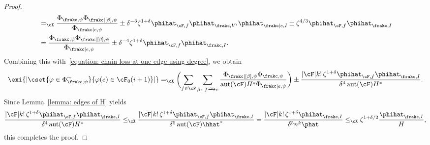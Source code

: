 \documentclass[11pt]{amsart}
\DeclarePairedDelimiter{\paren}{\lparen}{\rparen}
\DeclarePairedDelimiter{\abs}{\lvert}{\rvert}
\newcommand{\Xleq}{\leq_{\cX}}
\newcommand{\Xeq}{=_{\cX}}
\def\phi{\varphi}
\newcommand{\bijection}{\mathchoice
	{\xrightarrow{\smash{\raisebox{-3pt}{$\scriptstyle\sim$}}}}%
	{\xrightarrow{\smash{\raisebox{-3pt}{$\scriptstyle\sim$}}}}%
	{\xrightarrow{\smash{\raisebox{-2.5pt}{$\scriptscriptstyle\sim$}}}}%
	{\xrightarrow{\smash{\raisebox{-2.5pt}{$\scriptscriptstyle\sim$}}}}%
}
\DeclareMathOperator{\aut}{aut}
\theoremstyle{definition}
\numberwithin{equation}{section}
\begin{document}
\begin{proof}
\begin{equation*}
\begin{aligned}
				&\Xeq \frac{\Phi_{\frakc,\psi}\Phi_{\frakc|[\beta],\psi}}{\Phi_{\frakc|e,\psi}}\pm \delta^{-3}\zeta^{1+\delta}\phihat_{\cF,f}\phihat_{\frakc,V'}\phihat_{\frakc|e,I}\pm \zeta^{4/3}\phihat_{\cF,f}\phihat_{\frakc,I}\\
				&= \frac{\Phi_{\frakc,\psi}\Phi_{\frakc|[\beta],\psi}}{\Phi_{\frakc|e,\psi}}\pm \delta^{-4}\zeta^{1+\delta}\phihat_{\cF,f}\phihat_{\frakc,I}.
			\end{aligned}
		\end{equation*}
		Combining this with~\eqref{equation: chain loss at one edge using degree}, we obtain
		\begin{equation*}
			\exi{\abs{\cset{ \phi\in\Phi^\sim_{\frakc,\psi} }{ \phi(e)\in \cF_0(i+1) }}}
			\Xeq \paren[\bigg]{\sum_{f\in\cF}\sum_{\beta\colon f\bijection e}\frac{\Phi_{\frakc|[\beta],\psi}\Phi_{\frakc,\psi} }{\aut(\cF)H^*\Phi_{\frakc|e,\psi}}}\pm \frac{\abs{\cF}k!\, \zeta^{1+\delta}\phihat_{\cF,f}\phihat_{\frakc,I}}{\delta^4\aut(\cF)H^*}.
		\end{equation*}
		Since Lemma~\ref{lemma: edges of H} yields
		\begin{equation*}
			\frac{\abs{\cF}k!\, \zeta^{1+\delta}\phihat_{\cF,f}\phihat_{\frakc,I}}{\delta^4\aut(\cF)H^*}
			\Xleq\frac{\abs{\cF}k!\, \zeta^{1+\delta}\phihat_{\cF,f}\phihat_{\frakc,I}}{\delta^5\aut(\cF)\hhat^*}
			= \frac{\abs{\cF}k!\, \zeta^{1+\delta}\phihat_{\frakc,I}}{\delta^5 n^k\phat}
			\Xleq \zeta^{1+\delta/2}\frac{\phihat_{\frakc,I}}{H},
		\end{equation*}
		this completes the proof.
	\end{proof}
\end{document}
